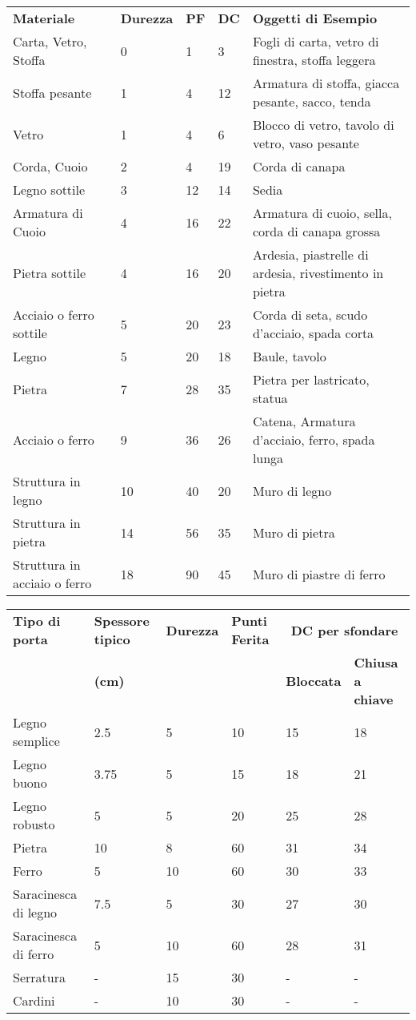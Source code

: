 \documentclass[landscape,10pt,a4paper]{article}
\begin{document}
\begin{multicols}{3}
\noindent\begin{tabularx}{0.98\textwidth}{lllll}
	\toprule{}
	\textbf{Materiale} &\textbf{Durezza}&\textbf{PF} &\textbf{DC} & \textbf{Oggetti di Esempio}\\
	Carta, Vetro, Stoffa&0& 1&3&Fogli di carta, vetro di finestra, stoffa leggera\\
	Stoffa pesante &1& 4& 12&Armatura di stoffa, giacca pesante, sacco, tenda\\
	Vetro&1&4&6&Blocco di vetro, tavolo di vetro, vaso pesante\\
	Corda, Cuoio&2&4&19&Corda di canapa\\
	Legno sottile&3&12&14&Sedia\\
	Armatura di Cuoio &4&16&22&Armatura di cuoio, sella, corda di canapa grossa\\
	Pietra sottile&4&16&20&Ardesia, piastrelle di ardesia, rivestimento in pietra\\
	Acciaio o ferro sottile&5&20&23&Corda di seta, scudo d'acciaio, spada corta\\
	Legno&5&20&18&Baule, tavolo\\
	Pietra&7&28&35&Pietra per lastricato, statua\\
	Acciaio o ferro&9&36&26&Catena, Armatura d'acciaio, ferro, spada lunga\\
	Struttura in legno&10&40&20&Muro di legno\\
	Struttura in pietra&14&56&35&Muro di pietra\\
	Struttura in acciaio o ferro&18&90&45&Muro di piastre di ferro
\end{tabularx}	

\noindent\begin{tabular}{llllll}
	\textbf{Tipo di porta} & \textbf{Spessore tipico} & \textbf{Durezza} & \textbf{Punti Ferita} & \multicolumn{2}{c}{\textbf{DC per sfondare}} \\
	
	&\textbf{(cm)}&&& \textbf{Bloccata} & \textbf{Chiusa a chiave}\\
	\toprule
	Legno semplice & 2.5& 5 & 10& 15 & 18\\
	Legno buono& 3.75 & 5 & 15& 18 & 21\\
	Legno robusto& 5& 5 & 20& 25 & 28\\
	Pietra& 10 & 8 & 60& 31 & 34\\
	Ferro & 5& 10& 60& 30 & 33\\
	Saracinesca di legno & 7.5& 5 & 30& 27& 30\\
	Saracinesca di ferro & 5& 10& 60& 28& 31\\
	Serratura& -& 15& 30& -& -\\
	Cardini & -& 10& 30& -& -\\
\end{tabular}



\end{multicols}
\end{document}
